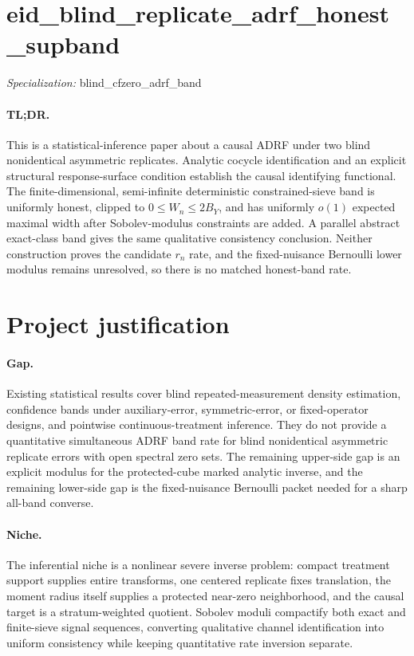 \documentclass{article}
\begin{document}
\sloppy

\section*{eid\_\allowbreak{}blind\_\allowbreak{}replicate\_\allowbreak{}adrf\_\allowbreak{}honest\_\allowbreak{}supband}

\noindent\textit{Specialization:} blind\_\allowbreak{}cfzero\_\allowbreak{}adrf\_\allowbreak{}band\par

\paragraph{TL;DR.} This is a statistical-inference paper about a causal ADRF under two blind nonidentical asymmetric replicates. Analytic cocycle identification and an explicit structural response-surface condition establish the causal identifying functional. The finite-dimensional, semi-infinite deterministic constrained-sieve band is uniformly honest, clipped to \(0\le W_n\le2B_Y\), and has uniformly \(o(1)\) expected maximal width after Sobolev-modulus constraints are added. A parallel abstract exact-class band gives the same qualitative consistency conclusion. Neither construction proves the candidate \(r_n\) rate, and the fixed-nuisance Bernoulli lower modulus remains unresolved, so there is no matched honest-band rate.

\section{Project justification}

\paragraph{Gap.} Existing statistical results cover blind repeated-measurement density estimation, confidence bands under auxiliary-error, symmetric-error, or fixed-operator designs, and pointwise continuous-treatment inference. They do not provide a quantitative simultaneous ADRF band rate for blind nonidentical asymmetric replicate errors with open spectral zero sets. The remaining upper-side gap is an explicit modulus for the protected-cube marked analytic inverse, and the remaining lower-side gap is the fixed-nuisance Bernoulli packet needed for a sharp all-band converse.

\paragraph{Niche.} The inferential niche is a nonlinear severe inverse problem: compact treatment support supplies entire transforms, one centered replicate fixes translation, the moment radius itself supplies a protected near-zero neighborhood, and the causal target is a stratum-weighted quotient. Sobolev moduli compactify both exact and finite-sieve signal sequences, converting qualitative channel identification into uniform consistency while keeping quantitative rate inversion separate.
\end{document}
